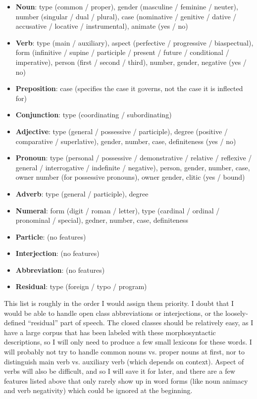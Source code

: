 \documentclass[11pt,letterpaper]{article}
\begin{document}
\begin{itemize}
  \item \textbf{Noun}: type (common / proper), gender
    (masculine / feminine / neuter), number (singular / dual / plural),
    case (nominative / genitive / dative / accusative / locative /
    instrumental), animate (yes / no)
  \item \textbf{Verb}: type (main / auxiliary), aspect (perfective /
    progressive / biaspectual), form (infinitive / supine / participle /
    present / future / conditional / imperative), person (first / second /
    third), number, gender, negative (yes / no)
  \item \textbf{Preposition}: case (specifies the case it governs, not the case
    it is inflected for)
  \item \textbf{Conjunction}: type (coordinating / subordinating)
  \item \textbf{Adjective}: type (general / possessive / participle), degree
    (positive / comparative / superlative), gender, number, case, definiteness
    (yes / no)
  \item \textbf{Pronoun}: type (personal / possessive / demonstrative /
    relative / reflexive / general / interrogative / indefinite / negative),
    person, gender, number, case, owner number (for possessive pronouns), owner
    gender, clitic (yes / bound)
  \item \textbf{Adverb}: type (general / participle), degree
  \item \textbf{Numeral}: form (digit / roman / letter), type (cardinal /
    ordinal / pronominal / special), gedner, number, case, definiteness
  \item \textbf{Particle}: (no features)
  \item \textbf{Interjection}: (no features)
  \item \textbf{Abbreviation}: (no features)
  \item \textbf{Residual}: type (foreign / typo / program)
\end{itemize}

This list is roughly in the order I would assign them priority.  I doubt that I
would be able to handle open class abbreviations or interjections, or the
loosely-defined ``residual'' part of speech.  The closed classes should be
relatively easy, as I have a large corpus that has been labeled with these
morphosyntactic descriptions, so I will only need to produce a few small
lexicons for these words.  I will probably not try to handle common nouns vs.
proper nouns at first, nor to distinguish main verb vs. auxiliary verb (which
depends on context).  Aspect of verbs will also be difficult, and so I will
save it for later, and there are a few features listed above that only rarely
show up in word forms (like noun animacy and verb negativity) which could be
ignored at the beginning.
\end{document}
